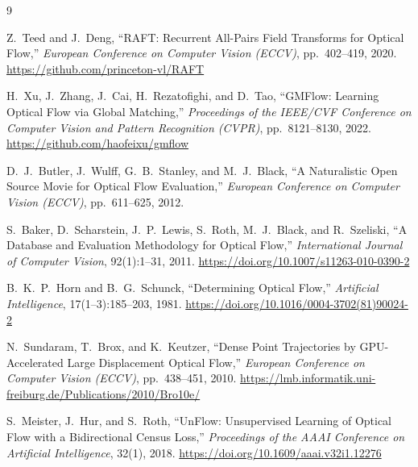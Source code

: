 \documentclass[11pt,a4paper]{article}
\begin{document}
\begingroup
\small
\begin{thebibliography}{9}

Z.~Teed and J.~Deng,
``RAFT: Recurrent All-Pairs Field Transforms for Optical Flow,''
\textit{European Conference on Computer Vision (ECCV)}, pp.~402--419, 2020.
\url{https://github.com/princeton-vl/RAFT}

H.~Xu, J.~Zhang, J.~Cai, H.~Rezatofighi, and D.~Tao,
``GMFlow: Learning Optical Flow via Global Matching,''
\textit{Proceedings of the IEEE/CVF Conference on Computer Vision and Pattern Recognition (CVPR)}, pp.~8121--8130, 2022.
\url{https://github.com/haofeixu/gmflow}

D.~J.~Butler, J.~Wulff, G.~B.~Stanley, and M.~J.~Black,
``A Naturalistic Open Source Movie for Optical Flow Evaluation,''
\textit{European Conference on Computer Vision (ECCV)}, pp.~611--625, 2012.

S.~Baker, D.~Scharstein, J.~P.~Lewis, S.~Roth, M.~J.~Black, and R.~Szeliski,
``A Database and Evaluation Methodology for Optical Flow,''
\textit{International Journal of Computer Vision}, 92(1):1--31, 2011.
\url{https://doi.org/10.1007/s11263-010-0390-2}

B.~K.~P.~Horn and B.~G.~Schunck,
``Determining Optical Flow,''
\textit{Artificial Intelligence}, 17(1--3):185--203, 1981.
\url{https://doi.org/10.1016/0004-3702(81)90024-2}

N.~Sundaram, T.~Brox, and K.~Keutzer,
``Dense Point Trajectories by GPU-Accelerated Large Displacement Optical Flow,''
\textit{European Conference on Computer Vision (ECCV)}, pp.~438--451, 2010.
\url{https://lmb.informatik.uni-freiburg.de/Publications/2010/Bro10e/}

S.~Meister, J.~Hur, and S.~Roth,
``UnFlow: Unsupervised Learning of Optical Flow with a Bidirectional Census Loss,''
\textit{Proceedings of the AAAI Conference on Artificial Intelligence}, 32(1), 2018.
\url{https://doi.org/10.1609/aaai.v32i1.12276}

\end{thebibliography}
\endgroup
\end{document}
